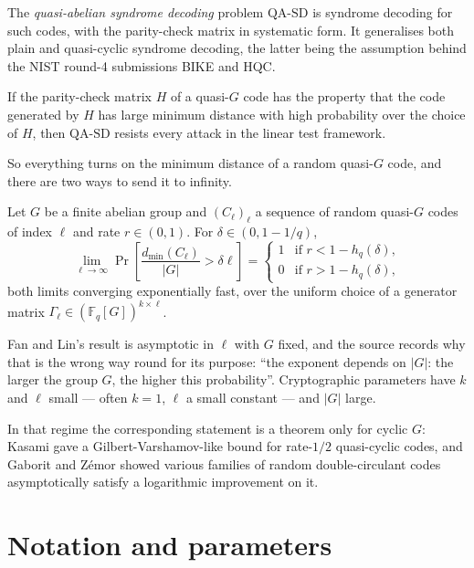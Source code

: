 \documentclass{aicr-conjecture}
\newcommand{\FqG}{\mathbb{F}_{q}[G]}
\newcommand{\dmin}{d_{\min}}
\newcommand{\hq}{h_{q}}
\begin{document}
The \emph{quasi-abelian syndrome decoding} problem $\mathrm{QA\text{-}SD}$
is syndrome decoding for such codes, with the parity-check matrix in
systematic form. It generalises both plain and quasi-cyclic syndrome
decoding, the latter being the assumption behind the NIST round-4
submissions BIKE and HQC\@.

\begin{theorem}\label{thm:lineartest}
If the parity-check matrix $H$ of a quasi-$G$ code has the property that
the code generated by $H$ has large minimum distance with high
probability over the choice of $H$, then $\mathrm{QA\text{-}SD}$ resists
every attack in the linear test framework.
\end{theorem}

So everything turns on the minimum distance of a random quasi-$G$ code,
and there are two ways to send it to infinity.

\begin{theorem}\label{thm:fanlin}
Let $G$ be a finite abelian group and $(C_{\ell})_{\ell}$ a sequence of
random quasi-$G$ codes of index $\ell$ and rate $r \in (0,1)$. For
$\delta \in (0, 1 - 1/q)$,
\[
  \lim_{\ell \to \infty}
  \Pr\!\left[ \frac{\dmin(C_{\ell})}{|G|} > \delta \ell \right]
  = \begin{cases} 1 & \text{if } r < 1 - \hq(\delta),\\
                  0 & \text{if } r > 1 - \hq(\delta),\end{cases}
\]
both limits converging exponentially fast, over the uniform choice of a
generator matrix $\Gamma_{\ell} \in (\FqG)^{k \times \ell}$.
\end{theorem}

Fan and Lin's result is asymptotic in $\ell$ with $G$ fixed, and the
source records why that is the wrong way round for its purpose: ``the
exponent depends on $|G|$: the larger the group $G$, the higher this
probability''. Cryptographic parameters have $k$ and $\ell$ small ---
often $k=1$, $\ell$ a small constant --- and $|G|$ large.

In that regime the corresponding statement is a theorem only for cyclic
$G$: Kasami gave a Gilbert-Varshamov-like bound for rate-$1/2$
quasi-cyclic codes, and Gaborit and Z\'emor showed various families of
random double-circulant codes asymptotically satisfy a logarithmic
improvement on it.

\section{Notation and parameters}\label{sec:notation}
\end{document}

